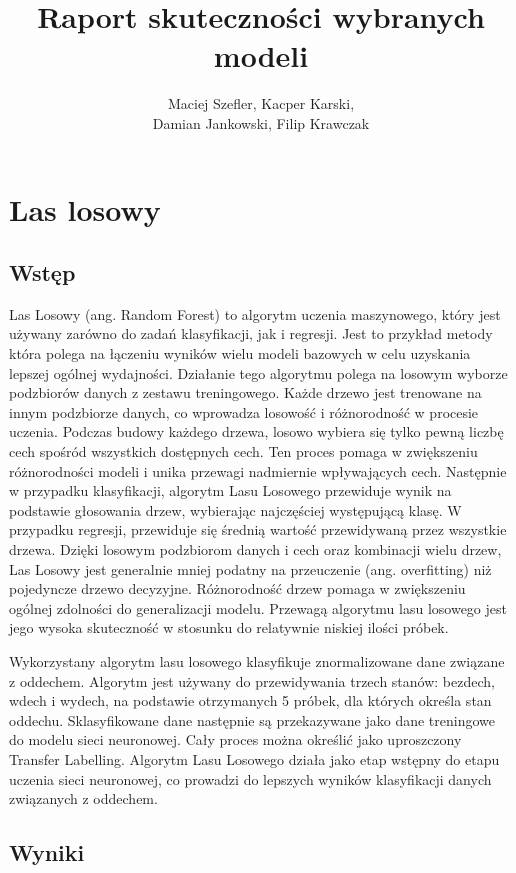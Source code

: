 \documentclass{article}
\title{Raport skuteczności wybranych modeli}
\author{Maciej Szefler, Kacper Karski,
    \\Damian Jankowski, Filip Krawczak}
\begin{document}
\maketitle

\tableofcontents

\section{Las losowy}
\subsection{Wstęp}

Las Losowy (ang. Random Forest) to algorytm uczenia maszynowego, który jest używany zarówno do zadań klasyfikacji, jak i regresji. Jest to przykład metody która polega na łączeniu wyników wielu modeli bazowych w celu uzyskania lepszej ogólnej wydajności. Działanie tego algorytmu polega na losowym wyborze podzbiorów danych z zestawu treningowego. Każde drzewo jest trenowane na innym podzbiorze danych, co wprowadza losowość i różnorodność w procesie uczenia. Podczas budowy każdego drzewa, losowo wybiera się tylko pewną liczbę cech spośród wszystkich dostępnych cech. Ten proces pomaga w zwiększeniu różnorodności modeli i unika przewagi nadmiernie wpływających cech. Następnie w przypadku klasyfikacji, algorytm Lasu Losowego przewiduje wynik na podstawie głosowania drzew, wybierając najczęściej występującą klasę. W przypadku regresji, przewiduje się średnią wartość przewidywaną przez wszystkie drzewa. Dzięki losowym podzbiorom danych i cech oraz kombinacji wielu drzew, Las Losowy jest generalnie mniej podatny na przeuczenie (ang. overfitting) niż pojedyncze drzewo decyzyjne. Różnorodność drzew pomaga w zwiększeniu ogólnej zdolności do generalizacji modelu.  Przewagą algorytmu lasu losowego jest jego wysoka skuteczność w stosunku do relatywnie niskiej ilości próbek.

Wykorzystany algorytm lasu losowego klasyfikuje znormalizowane dane związane z oddechem. Algorytm jest używany do przewidywania trzech stanów: bezdech, wdech i wydech, na podstawie otrzymanych 5 próbek, dla których określa stan oddechu. Sklasyfikowane dane następnie są przekazywane jako dane treningowe do modelu sieci neuronowej. Cały proces można określić jako uproszczony Transfer Labelling. Algorytm Lasu Losowego działa jako etap wstępny do etapu uczenia sieci neuronowej, co prowadzi do lepszych wyników klasyfikacji danych związanych z oddechem.


\subsection{Wyniki}
\end{document}
